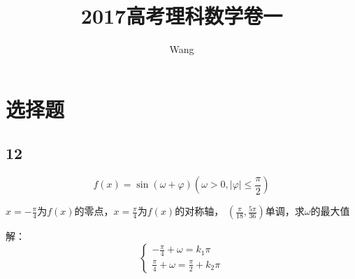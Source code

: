 \documentclass[UTF8]{ctexart}
\title{2017高考理科数学卷一}
\author{Wang}
\begin{document}
    \maketitle
    \section{选择题}
    \subsection{12}
    \[f(x)=\sin(\omega+\varphi)(\omega>0,|\varphi|\leq \frac{\pi}{2})\]

    $x=-\frac{\pi}{4}$为$f(x)$的零点，$x=\frac{\pi}{4}$为$f(x)$的对称轴，
    $(\frac{\pi}{18},\frac{5\pi}{36})$单调，求$\omega$的最大值

    解：
    \begin{equation}
        \left\{
            \begin{align}
                -\frac{\pi}{4}+\omega =k_1\pi \\
                \frac{\pi}{4}+\omega =\frac{\pi}{2}+k_2\pi           
            \end{align}
        \right.
    \end{equation}
    
   
\end{document}
